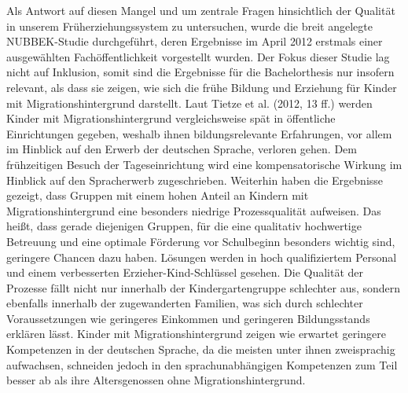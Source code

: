 Als Antwort auf diesen Mangel und um zentrale Fragen
hinsichtlich der Qualität in unserem Früherziehungssystem zu
untersuchen, wurde die breit angelegte NUBBEK-Studie durchgeführt, deren Ergebnisse im April 2012 erstmals einer ausgewählten Fachöffentlichkeit vorgestellt wurden. 
Der Fokus dieser Studie lag nicht auf Inklusion, somit sind die Ergebnisse für die Bachelorthesis nur insofern relevant, als dass sie zeigen, wie sich die frühe Bildung und Erziehung für Kinder mit Migrationshintergrund darstellt. 
Laut Tietze et al. (2012, 13 ff.) werden Kinder mit Migrationshintergrund vergleichsweise spät in öffentliche Einrichtungen  gegeben, weshalb ihnen bildungsrelevante Erfahrungen, vor allem im Hinblick auf den Erwerb der deutschen Sprache, verloren gehen. Dem frühzeitigen Besuch der Tageseinrichtung wird eine kompensatorische Wirkung im Hinblick auf den Spracherwerb zugeschrieben. Weiterhin haben die Ergebnisse gezeigt, dass Gruppen mit einem hohen Anteil an Kindern mit Migrationshintergrund eine besonders niedrige Prozessqualität aufweisen. Das heißt, dass gerade diejenigen Gruppen, für die eine qualitativ hochwertige Betreuung und eine optimale Förderung vor Schulbeginn besonders wichtig sind, geringere Chancen dazu haben.
Lösungen werden in hoch qualifiziertem Personal und einem verbesserten
Erzieher-Kind-Schlüssel gesehen. 
Die Qualität der Prozesse fällt nicht nur innerhalb der Kindergartengruppe schlechter aus, sondern ebenfalls innerhalb der zugewanderten Familien, was sich durch schlechter Voraussetzungen wie  geringeres Einkommen und geringeren Bildungsstands erklären lässt. 
Kinder mit Migrationshintergrund zeigen wie erwartet geringere Kompetenzen in der deutschen Sprache, da die meisten unter ihnen zweisprachig aufwachsen, schneiden jedoch in den sprachunabhängigen Kompetenzen zum Teil besser ab als ihre Altersgenossen ohne Migrationshintergrund.
  
